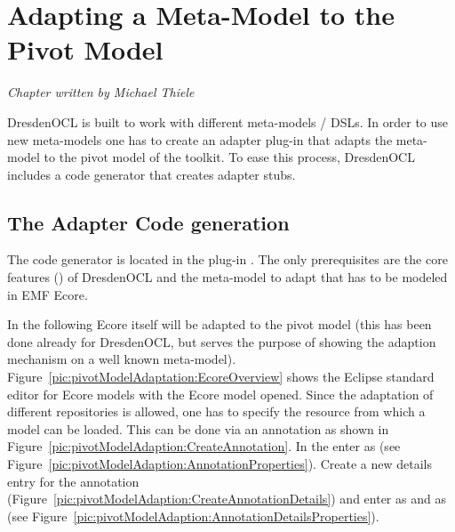 \chapter{Adapting a Meta-Model to the Pivot Model}
\label{chapter:pivotModelAdaptation}

\begin{flushright}
\textit{Chapter written by Michael Thiele}
\end{flushright}

DresdenOCL is built to work with different meta-models / \acs{DSL}s. In order to
use new meta-models one has to create an adapter plug-in that adapts the
meta-model to the pivot model of the toolkit. To ease this process, DresdenOCL
includes a code generator that creates adapter stubs.



\section{The Adapter Code generation}

The code generator is located in the plug-in 
. The only prerequisites are 
the core features () of DresdenOCL and
the meta-model to adapt that has to be modeled in \acs{EMF} Ecore.

In the following Ecore itself will be adapted to the pivot model (this has been 
done already for DresdenOCL, but serves the purpose of showing the adaption
mechanism on a well known meta-model). 
Figure~\ref{pic:pivotModelAdaptation:EcoreOverview} shows the Eclipse standard 
editor for Ecore models with the Ecore model opened. Since the adaptation of 
different repositories is allowed, one has to specify the resource from which a 
model can be loaded. This can be done via an annotation as shown in 
Figure~\ref{pic:pivotModelAdaption:CreateAnnotation}. In the  enter  as 
 (see Figure~\ref{pic:pivotModelAdaption:AnnotationProperties}). 
Create a new details entry for the annotation 
(Figure~\ref{pic:pivotModelAdaption:CreateAnnotationDetails}) and enter 
 as  and 
as  (see 
Figure~\ref{pic:pivotModelAdaption:AnnotationDetailsProperties}).

